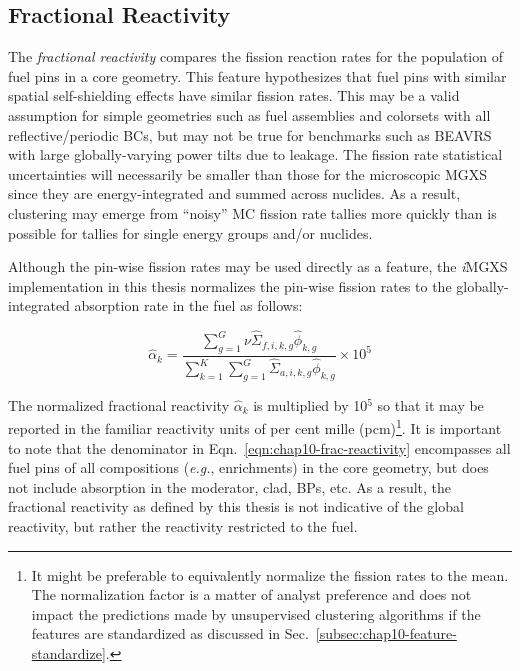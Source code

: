 \clearpage

\subsection{Fractional Reactivity}
\label{subsec:chap10-frac-reactivity}

The \textit{fractional reactivity} compares the fission reaction rates for the population of fuel pins in a core geometry. This feature hypothesizes that fuel pins with similar spatial self-shielding effects have similar fission rates. This may be a valid assumption for simple geometries such as fuel assemblies and colorsets with all reflective/periodic \acp{BC}, but may not be true for benchmarks such as \ac{BEAVRS} with large globally-varying power tilts due to leakage. The fission rate statistical uncertainties will necessarily be smaller than those for the microscopic \ac{MGXS} since they are energy-integrated and summed across nuclides. As a result, clustering may emerge from ``noisy'' \ac{MC} fission rate tallies more quickly than is possible for tallies for single energy groups and/or nuclides.

Although the pin-wise fission rates may be used directly as a feature, the \textit{i}\ac{MGXS} implementation in this thesis normalizes the pin-wise fission rates to the globally-integrated absorption rate in the fuel as follows:

\begin{equation}
\label{eqn:chap10-frac-reactivity}
\hat{\alpha}_{k} = \frac{\displaystyle\sum\limits_{g=1}^{G}\nu\hat{\Sigma}_{f,i,k,g}\hat{\phi}_{k,g}}{\displaystyle\sum\limits_{k=1}^{K}\displaystyle\sum\limits_{g=1}^{G}\hat{\Sigma}_{a,i,k,g}\hat{\phi}_{k,g}} \times 10^{5}
\end{equation}

\noindent The normalized fractional reactivity $\hat{\alpha}_{k}$  is multiplied by 10$^{5}$ so that it may be reported in the familiar reactivity units of per cent mille (pcm)\footnote{It might be preferable to equivalently normalize the fission rates to the mean. The normalization factor is a matter of analyst preference and does not impact the predictions made by unsupervised clustering algorithms if the features are standardized as discussed in Sec.~\ref{subsec:chap10-feature-standardize}.}. It is important to note that the denominator in Eqn.~\ref{eqn:chap10-frac-reactivity} encompasses all fuel pins of all compositions (\textit{e.g.}, enrichments) in the core geometry, but does not include absorption in the moderator, clad, \acp{BP}, etc. As a result, the fractional reactivity as defined by this thesis is not indicative of the global reactivity, but rather the reactivity restricted to the fuel.

